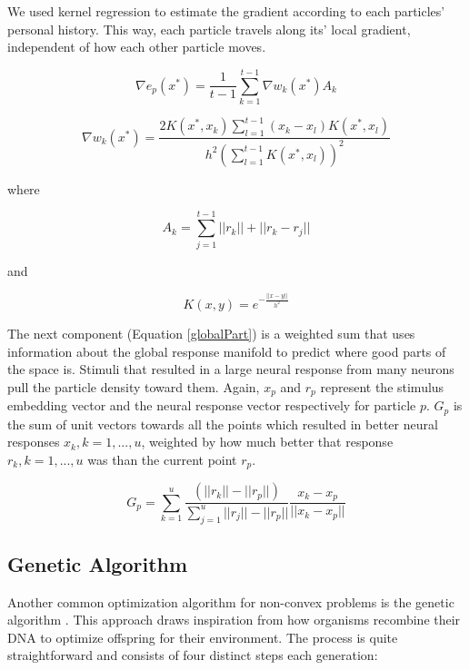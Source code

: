 We used kernel regression to estimate the gradient according to each particles’ personal history. This way, each particle travels along its' local gradient, independent of how each other particle moves. 

\begin{equation}
	\nabla e_p (x^* )=\frac{1}{t-1} \sum_{k=1}^{t-1} \nabla w_k (x^* )  A_k
\end{equation}

\begin{equation}
	\nabla w_k (x^* )=\frac{2K(x^*,x_k) \sum_{l=1}^{t-1} (x_k-x_l)K(x^*,x_l)} {h^2\left(\sum_{l=1}^{t-1}K(x^*, x_l)\right)^2}
\end{equation}

where

\begin{equation}
	A_k = \sum_{j=1}^{t-1}||r_k||+||r_k-r_j||
\end{equation}

and

\begin{equation}
	K(x,y)=e^{- \frac{||x-y||}{h^2}}
\end{equation}

The next component (Equation \ref{globalPart}) is a weighted sum that uses information about the global response manifold to predict where good parts of the space is. Stimuli that resulted in a large neural response from many neurons pull the particle density toward them. Again, $x_p$ and $r_p$ represent the stimulus embedding vector and the neural response vector respectively for particle $p$. $G_p$ is the sum of unit vectors towards all the points which resulted in better neural responses $x_k, k = 1,...,u$, weighted by how much better that response $r_k, k = 1,...,u$ was than the current point $r_p$.

\begin{equation}
	G_p = \sum_{k=1}^{u}\frac{(||r_k||-||r_p||)}{\sum_{j=1}^{u}||r_j||-||r_p||} \frac {x_k-x_p}{||x_k-x_p||}\label{globalPart}
\end{equation}

\subsection{Genetic Algorithm}
Another common optimization algorithm for non-convex problems is the genetic algorithm \parencite{Katoch2021}. This approach draws inspiration from how organisms recombine their DNA to optimize offspring for their environment. The process is quite straightforward and consists of four distinct steps each generation:

